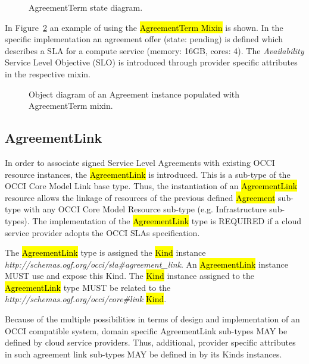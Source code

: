 \documentclass[10pt,a4paper]{article}
\begin{document}
\begin{figure}[!h]
	{\centering {} \par}
	\caption{AgreementTerm state diagram.}
	\label{fig:terms-states}
\end{figure}

In Figure~\ref{fig:terms-example} an example of using the \hl{AgreementTerm Mixin} is shown. In the specific implementation an agreement offer (state: pending) is defined which describes a SLA for a compute service (memory: 16GB, cores: 4). The \textit{Availability} Service Level Objective (SLO) is introduced through provider specific attributes in the respective mixin.

\begin{figure}[!h]
	{\centering {} \par}
	\caption{Object diagram of an Agreement instance populated with AgreementTerm mixin.}
	\label{fig:terms-example}
\end{figure}


\subsection{AgreementLink}
In order to associate signed Service Level Agreements with existing OCCI resource instances, the \hl{AgreementLink} is introduced. This is a sub-type of the OCCI Core Model Link base type. Thus, the instantiation of an \hl{AgreementLink} resource allows the linkage of resources of the previous defined \hl{Agreement} sub-type with any OCCI Core Model Resource sub-type (e.g. Infrastructure sub-types). The implementation of the \hl{AgreementLink} type is REQUIRED if a cloud service provider adopts the OCCI SLAs specification. 

The \hl{AgreementLink} type is assigned the \hl{Kind} instance \textit{http://schemas.ogf.org/occi/sla\#agreement\_link}. An \hl{AgreementLink} instance MUST use and expose this Kind. The \hl{Kind} instance assigned to the \hl{AgreementLink} type MUST be related to the \textit{http://schemas.ogf.org/occi/core\#link} \hl{Kind}.

Because of the multiple possibilities in terms of design and implementation of an OCCI compatible system, domain specific AgreementLink sub-types MAY be defined by cloud service providers. Thus, additional, provider specific attributes in such agreement link sub-types MAY be defined in by its Kinds instances. 
\end{document}
